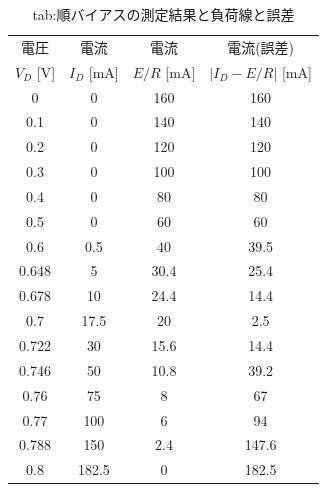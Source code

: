  \begin{table}[hbt]
    \centering
    \caption{tab:順バイアスの測定結果と負荷線と誤差}
    \begin{tabular}{|c|c|c|c|}
    \hline
    電圧 & 電流 & 電流 & 電流(誤差) \\
    $V_D$ [V] & $I_D$ [mA] & $E/R$ [mA] & $|I_D-E/R|$ [mA] \\ \hline
    0            & 0             & 160          & 160                 \\ \hline
    0.1          & 0             & 140          & 140                 \\ \hline
    0.2          & 0             & 120          & 120                 \\ \hline
    0.3          & 0             & 100          & 100                 \\ \hline
    0.4          & 0             & 80           & 80                  \\ \hline
    0.5          & 0             & 60           & 60                  \\ \hline
    0.6          & 0.5           & 40           & 39.5                \\ \hline
    0.648        & 5             & 30.4         & 25.4                \\ \hline
    0.678        & 10            & 24.4         & 14.4                \\ \hline
    0.7          & 17.5          & 20           & 2.5                 \\ \hline
    0.722        & 30            & 15.6         & 14.4                \\ \hline
    0.746        & 50            & 10.8         & 39.2                \\ \hline
    0.76         & 75            & 8            & 67                  \\ \hline
    0.77         & 100           & 6            & 94                  \\ \hline
    0.788        & 150           & 2.4          & 147.6               \\ \hline
    0.8          & 182.5         & 0            & 182.5               \\ \hline
    \end{tabular}
    \label{tab:diode1_}
  \end{table}

